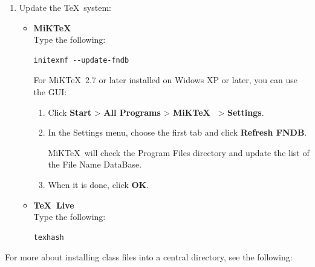 \documentclass[]{xfel.eu-report}
\begin{document}
\begin{enumerate}
  \newpage
  \item Update the \TeX\ system:
	\vspace*{\baselineheight}
	  \begin{itemize}
	  
	  \item {\bf MiK\TeX\ } \\
	  	Type the following:
	  	
		\begin{tcolorbox}[enlarge top by=\baselineheight, enlarge bottom by=\baselineheight]
			\begin{Verbatim}[fontsize=\small]
initexmf --update-fndb
			\end{Verbatim}
			\end{tcolorbox}
			
			For MiK\TeX\ 2.7 or later installed on Widows XP or later, you can use the GUI: 
			\linebreak
			\begin{enumerate}
	  			\item Click {\bf Start} > {\bf All Programs} > {\bf MiK\TeX\ } > {\bf Settings}. 
	  			\linebreak
				\item In the Settings menu, choose the first tab and click {\bf Refresh FNDB}.
				\linebreak
							
				MiK\TeX\ will check the Program Files directory and update the list of the File Name DataBase. 
				\linebreak
				\item When it is done, click {\bf OK}.
				\linebreak
			\end{enumerate}
		\item {\bf \TeX\ Live} \\
			Type the following:
			
		\begin{tcolorbox}[enlarge top by=\baselineheight, enlarge bottom by=\baselineheight]
			\begin{Verbatim}[fontsize=\small]
texhash
			\end{Verbatim}
			\end{tcolorbox}
		\end{itemize}
\end{enumerate}
For more about installing class files into a central directory, see the following:
\end{document}

